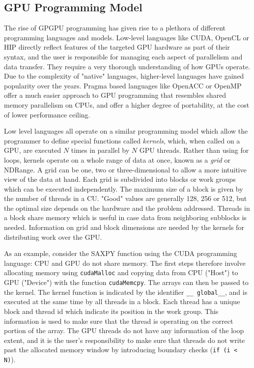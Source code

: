 \subsection{GPU Programming Model}

The rise of GPGPU programming has given rise to a plethora of different programming languages and models. Low-level languages like CUDA, OpenCL or HIP directly reflect features of the targeted GPU hardware as part of their syntax, and the user is responsible for managing each aspect of parallelism and data transfer. They require a very thorough understanding of how GPUs operate. Due to the complexity of "native" languages, higher-level languages have gained popularity over the years. Pragma based languages like OpenACC or OpenMP offer a much easier approach to GPU programming that resembles shared memory parallelism on CPUs, and offer a higher degree of portability, at the cost of lower performance ceiling.

Low level languages all operate on a similar programming model which allow the programmer to define special functions called \emph{kernels}, which, when called on a GPU, are executed $N$ times in parallel by $N$ GPU threads. Rather than using for loops, kernels operate on a whole range of data at once, known as a \emph{grid} or NDRange. A grid can be one, two or three-dimensional to allow a more intuitive view of the data at hand. Each grid is subdivided into blocks or work groups which can be executed independently. The maximum size of a block is given by the number of threads in a CU. "Good" values are generally 128, 256 or 512, but the optimal size depends on the hardware and the problem addressed. Threads in a block share memory which is useful in case data from neighboring subblocks is needed. Information on grid and block dimensions are needed by the kernels for distributing work over the GPU.

As an example, consider the SAXPY function using the CUDA programming language:
\noindent CPU and GPU do not share memory. The first steps therefore involve allocating memory using \texttt{cudaMalloc} and copying data from CPU ("Host") to GPU ("Device") with the function \texttt{cudaMemcpy}. The arrays can then be passed to the kernel. The kernel function is indicated by the identifier \texttt{\_\_ global\_\_}, and is executed at the same time by all threads in a block. Each thread has a unique block and thread id which indicate its position in the work group. This information is used to make sure that the thread is operating on the correct portion of the array. The GPU threads do not have any information of the loop extent, and it is the user's responsibility to make sure that threads do not write past the allocated memory window by introducing boundary checks (\texttt{if (i < N)}).

